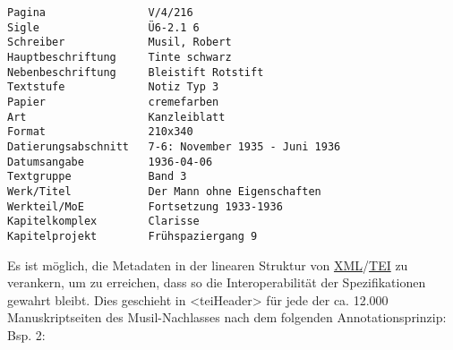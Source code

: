 \documentclass{article}
\begin{document}
        \begin{verbatim}Pagina                V/4/216
Sigle                 Ü6-2.1 6
Schreiber             Musil, Robert
Hauptbeschriftung     Tinte schwarz
Nebenbeschriftung     Bleistift Rotstift
Textstufe             Notiz Typ 3
Papier                cremefarben
Art                   Kanzleiblatt
Format                210x340
Datierungsabschnitt   7-6: November 1935 - Juni 1936
Datumsangabe          1936-04-06
Textgruppe            Band 3
Werk/Titel            Der Mann ohne Eigenschaften
Werkteil/MoE          Fortsetzung 1933-1936
Kapitelkomplex        Clarisse
Kapitelprojekt        Frühspaziergang 9\end{verbatim}Es ist möglich, die Metadaten in der linearen Struktur von \href{http://gams.uni-graz.at/o:konde.215}{XML}/\href{http://gams.uni-graz.at/o:konde.178}{TEI} zu verankern, um zu erreichen, dass so die Interoperabilität der
                  Spezifikationen gewahrt bleibt. Dies geschieht in <teiHeader>
                  für jede der ca. 12.000 Manuskriptseiten des Musil-Nachlasses nach dem folgenden
                  Annotationsprinzip: \\
            
        Bsp. 2:\\
            
\end{document}
